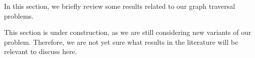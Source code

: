In this section, we briefly review some results related to our graph traversal problems.

This section is under construction, as we are still considering new variants of our problem.
Therefore, we are not yet sure what results in the literature will be relevant to discuss here.